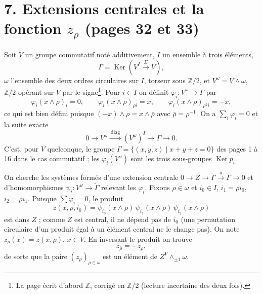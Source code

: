 \documentclass[11pt,a4paper]{article}
\begin{document}
\section*{7. Extensions centrales et la fonction $z_\rho$ (pages 32 et 33)}

Soit $V$ un groupe commutatif noté additivement, $I$ un ensemble à trois
éléments,
\[
\Gamma = \operatorname{Ker}(V^I \xrightarrow{\ \Sigma\ } V),
\]
$\omega$ l'ensemble des deux ordres circulaires sur $I$, torseur sous $\mathbb{Z}/2$,
et $V^\omega = V \wedge \omega$, $\mathbb{Z}/2$ opérant sur $V$ par le
signe\footnote{La page écrit d'abord $\mathbb{Z}$, corrigé en
$\mathbb{Z}/2$ (lecture incertaine des deux fois).}. Pour $i \in I$ on
définit $\varphi_i : V^\omega \to \Gamma$ par
\[
\varphi_i(x \wedge \rho)_i = 0, \qquad \varphi_i(x \wedge \rho)_{\rho i} = x,
\qquad \varphi_i(x \wedge \rho)_{\rho^2 i} = -x ,
\]
ce qui est bien défini puisque $(-x) \wedge \rho = x \wedge \bar\rho$ avec
$\bar\rho = \rho^{-1}$. On a $\sum_i \varphi_i = 0$ et la suite exacte
\[
0 \to V^\omega \xrightarrow{\ \mathrm{diag}\ } (V^\omega)^I \to \Gamma \to 0 .
\]
C'est, pour $V$ quelconque, le groupe $\Gamma = \lbrace (x, y, z) \mid x + y + z
= 0\rbrace$ des pages 1 à 16 dans le cas commutatif ; les $\varphi_i(V^\omega)$
sont les trois sous-groupes $\operatorname{Ker} p_i$.

On cherche les systèmes formés d'une extension centrale $0 \to Z \to
\widetilde\Gamma \xrightarrow{u} \Gamma \to 0$ et d'homomorphismes $\psi_i :
V^\omega \to \widetilde\Gamma$ relevant les $\varphi_i$. Fixons $\rho \in
\omega$ et $i_0 \in I$, $i_1 = \rho i_0$, $i_2 = \rho i_1$. Puisque $\sum
\varphi_i = 0$, le produit
\[
z(x, \rho, i_0) = \psi_{i_0}(x \wedge \rho)\, \psi_{i_1}(x \wedge \rho)\,
\psi_{i_2}(x \wedge \rho)
\]
est dans $Z$ ; comme $Z$ est central, il ne dépend pas de $i_0$ (une
permutation circulaire d'un produit égal à un élément central ne le change
pas). On note $z_\rho(x) = z(x, \rho)$, $x \in V$. En inversant le produit on
trouve
\[
z_{\bar\rho} = -z_\rho ,
\]
de sorte que la paire $(z_\rho)_{\rho \in \omega}$ est un élément de $Z^V
\wedge_{\pm 1} \omega$.
\end{document}
